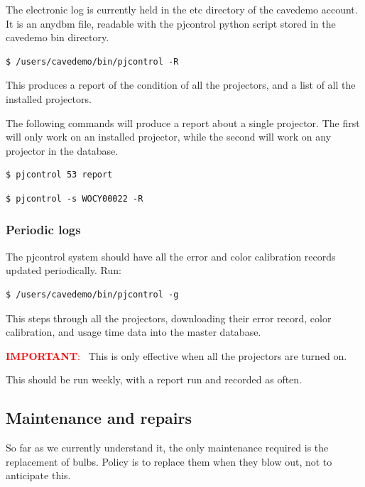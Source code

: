\documentclass[11pt]{article}
\newenvironment{note}[1][Note]{\begin{lrbox}{\notebox}%
    \begin{minipage}{0.9\columnwidth}\textcolor{red}{\textbf{#1}:~}}%
    {\end{minipage}\end{lrbox}\begin{center}\setlength{\fboxsep}{8pt}%
    \fbox{\usebox{\notebox}}\end{center}}
\begin{document}
The electronic log is currently held in the etc directory of the
cavedemo account.  It is an anydbm file, readable with the pjcontrol
python script stored in the cavedemo bin directory.

\begin{verbatim}
$ /users/cavedemo/bin/pjcontrol -R
\end{verbatim}

This produces a report of the condition of all the projectors, and a
list of all the installed projectors.

The following commands will produce a report about a single
projector.  The first will only work on an installed projector, while
the second will work on any projector in the database.

\begin{verbatim}
$ pjcontrol 53 report
\end{verbatim}

\begin{verbatim}
$ pjcontrol -s WOCY00022 -R
\end{verbatim}

\subsubsection{Periodic logs}

The pjcontrol system should have all the error and color calibration
records updated periodically.  Run:

\begin{verbatim}
$ /users/cavedemo/bin/pjcontrol -g
\end{verbatim}

This steps through all the projectors, downloading their error
record, color calibration, and usage time data into the master
database.

\begin{note}[IMPORTANT]
This is only effective when all the projectors are turned on.
\end{note}

This should be run weekly, with a report run and recorded as often.


\subsection{Maintenance and repairs}

So far as we currently understand it, the only maintenance required is
the replacement of bulbs.  Policy is to replace them when they blow
out, not to anticipate this.
\end{document}
